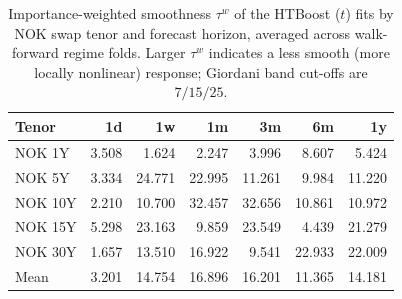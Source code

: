 \begin{table}[htbp]
\centering
\caption{Importance-weighted smoothness $\tau^{w}$ of the HTBoost ($t$) fits by NOK swap tenor and forecast horizon, averaged across walk-forward regime folds. Larger $\tau^{w}$ indicates a less smooth (more locally nonlinear) response; Giordani band cut-offs are $7/15/25$.}
\label{tab:is_tau}
\footnotesize
\begin{tabular}{lrrrrrr}
\toprule
Tenor & 1d & 1w & 1m & 3m & 6m & 1y \\
\midrule
NOK 1Y & 3.508 & 1.624 & 2.247 & 3.996 & 8.607 & 5.424 \\
NOK 5Y & 3.334 & 24.771 & 22.995 & 11.261 & 9.984 & 11.220 \\
NOK 10Y & 2.210 & 10.700 & 32.457 & 32.656 & 10.861 & 10.972 \\
NOK 15Y & 5.298 & 23.163 & 9.859 & 23.549 & 4.439 & 21.279 \\
NOK 30Y & 1.657 & 13.510 & 16.922 & 9.541 & 22.933 & 22.009 \\
\midrule Mean & 3.201 & 14.754 & 16.896 & 16.201 & 11.365 & 14.181 \\
\bottomrule
\end{tabular}
\end{table}
